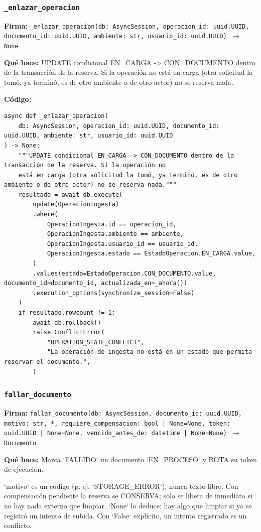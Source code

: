 \documentclass[11pt,a4paper]{article}
\begin{document}
\subsubsection*{\texttt{\_enlazar\_operacion}}
\textbf{Firma:} \texttt{\_enlazar\_operacion(db: AsyncSession, operacion\_id: uuid.UUID, documento\_id: uuid.UUID, ambiente: str, usuario\_id: uuid.UUID) $\rightarrow$ None}

\textbf{Qué hace:} UPDATE condicional EN\_CARGA -> CON\_DOCUMENTO dentro de la transacción de la reserva. Si la operación no
está en carga (otra solicitud la tomó, ya terminó, es de otro ambiente o de otro actor) no se reserva nada.

\textbf{Código:}
\begin{lstlisting}
async def _enlazar_operacion(
    db: AsyncSession, operacion_id: uuid.UUID, documento_id: uuid.UUID, ambiente: str, usuario_id: uuid.UUID
) -> None:
    """UPDATE condicional EN_CARGA -> CON_DOCUMENTO dentro de la transacción de la reserva. Si la operación no
    está en carga (otra solicitud la tomó, ya terminó, es de otro ambiente o de otro actor) no se reserva nada."""
    resultado = await db.execute(
        update(OperacionIngesta)
        .where(
            OperacionIngesta.id == operacion_id,
            OperacionIngesta.ambiente == ambiente,
            OperacionIngesta.usuario_id == usuario_id,
            OperacionIngesta.estado == EstadoOperacion.EN_CARGA.value,
        )
        .values(estado=EstadoOperacion.CON_DOCUMENTO.value, documento_id=documento_id, actualizada_en=_ahora())
        .execution_options(synchronize_session=False)
    )
    if resultado.rowcount != 1:
        await db.rollback()
        raise ConflictError(
            "OPERATION_STATE_CONFLICT",
            "La operación de ingesta no está en un estado que permita reservar el documento.",
        )
\end{lstlisting}

\subsubsection*{\texttt{fallar\_documento}}
\textbf{Firma:} \texttt{fallar\_documento(db: AsyncSession, documento\_id: uuid.UUID, motivo: str, *, requiere\_compensacion: bool | None=None, token: uuid.UUID | None=None, vencido\_antes\_de: datetime | None=None) $\rightarrow$ Documento}

\textbf{Qué hace:} Marca `FALLIDO` un documento `EN\_PROCESO` y ROTA su token de ejecución.

`motivo` es un código (p. ej. `STORAGE\_ERROR`), nunca texto libre. Con compensación
pendiente la reserva se CONSERVA; solo se libera de inmediato si no hay nada
externo que limpiar. `None` lo deduce: hay algo que limpiar si ya se registró un
intento de subida. Con `False` explícito, un intento registrado es un conflicto.
\end{document}
